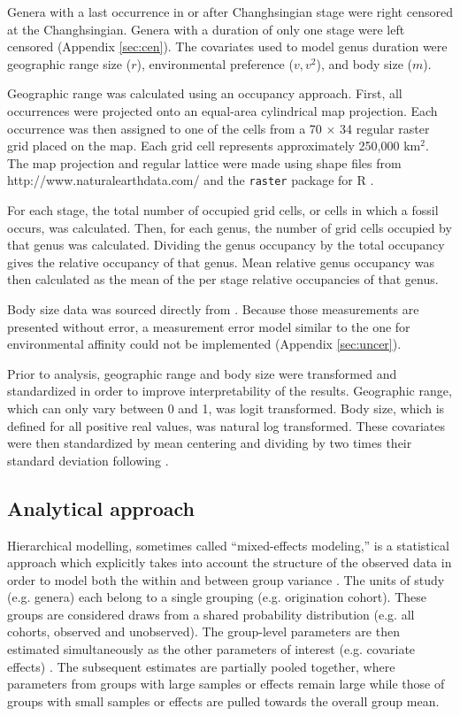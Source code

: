 \documentclass[12pt,letterpaper]{article}
\begin{document}
Genera with a last occurrence in or after Changhsingian stage were right censored at the Changhsingian. Genera with a duration of only one stage were left censored (Appendix \ref{sec:cen}). The covariates used to model genus duration were geographic range size (\(r\)), environmental preference (\(v, v^{2}\)), and body size (\(m\)). 

Geographic range was calculated using an occupancy approach. First, all occurrences were projected onto an equal-area cylindrical map projection. Each occurrence was then assigned to one of the cells from a 70 \(\times\) 34 regular raster grid placed on the map. Each grid cell represents approximately 250,000 km\(^{2}\). The map projection and regular lattice were made using shape files from http://www.naturalearthdata.com/ and the \texttt{raster} package for R \citep{raster}.

For each stage, the total number of occupied grid cells, or cells in which a fossil occurs, was calculated. Then, for each genus, the number of grid cells occupied by that genus was calculated. Dividing the genus occupancy by the total occupancy gives the relative occupancy of that genus. Mean relative genus occupancy was then calculated as the mean of the per stage relative occupancies of that genus. 

Body size data was sourced directly from \citet{Payne2014}. Because those measurements are presented without error, a measurement error model similar to the one for environmental affinity could not be implemented (Appendix \ref{sec:uncer}).

Prior to analysis, geographic range and body size were transformed and standardized in order to improve interpretability of the results. Geographic range, which can only vary between 0 and 1, was logit transformed. Body size, which is defined for all positive real values, was natural log transformed. These covariates were then standardized by mean centering and dividing by two times their standard deviation following \citet{Gelman2007}.

\subsection{Analytical approach}

Hierarchical modelling, sometimes called ``mixed-effects modeling,'' is a statistical approach which explicitly takes into account the structure of the observed data in order to model both the within and between group variance \citep{Gelman2013d,Gelman2007}. The units of study (e.g. genera) each belong to a single grouping (e.g. origination cohort). These groups are considered draws from a shared probability distribution (e.g. all cohorts, observed and unobserved). The group-level parameters are then estimated simultaneously as the other parameters of interest (e.g. covariate effects) \citep{Gelman2013d}. The subsequent estimates are partially pooled together, where parameters from groups with large samples or effects remain large while those of groups with small samples or effects are pulled towards the overall group mean. 
\end{document}
